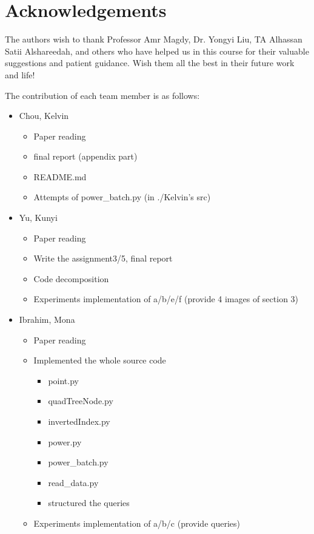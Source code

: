 \documentclass[]{IEEEphot}
\begin{document}
\newpage

\section*{Acknowledgements}
The authors wish to thank Professor Amr Magdy, Dr. Yongyi Liu, TA Alhassan Satii Alshareedah, and others who have helped us in this course for their valuable suggestions and patient guidance. Wish them all the best in their future work and life!

The contribution of each team member is as follows:

\begin{itemize}
\item Chou, Kelvin
\begin{itemize}
    \item Paper reading
    \item final report (appendix part)
    \item README.md
    \item Attempts of power\_batch.py (in ./Kelvin's src)
\end{itemize}

\item Yu, Kunyi
\begin{itemize}
    \item Paper reading
    \item Write the assignment3/5, final report
    \item Code decomposition
    \item Experiments implementation of a/b/e/f (provide 4 images of section 3)
\end{itemize}

\item Ibrahim, Mona
\begin{itemize}
    \item Paper reading
    \item Implemented the whole source code
          \begin{itemize}
              \item point.py
              \item quadTreeNode.py
              \item invertedIndex.py
              \item power.py
              \item power\_batch.py
              \item read\_data.py
              \item structured the queries
          \end{itemize}
    \item Experiments implementation of a/b/c (provide queries)
\end{itemize}
\end {itemize}
\end{document}
